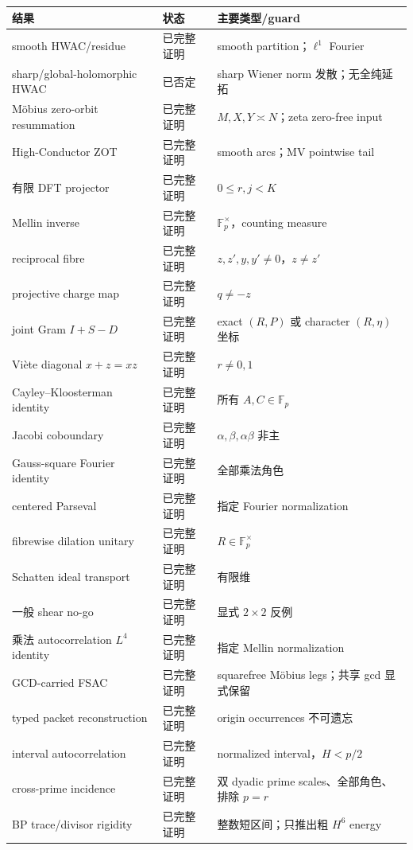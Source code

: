 \documentclass[11pt,a4paper]{ctexart}
\theoremstyle{definition}
\newcommand{\F}{\mathbb F}
\newcommand{\G}{\F_p^\times}
\newcommand{\1}{\mathbf 1}
\begin{document}
\begin{center}
\begin{tabular}{p{}p{}p{}}
\toprule
结果 & 状态 & 主要类型/guard\\
\midrule
smooth HWAC/residue & 已完整证明 & smooth partition；$\ell^1$ Fourier\\
sharp/global-holomorphic HWAC & 已否定 & sharp Wiener norm 发散；无全纯延拓\\
Möbius zero-orbit resummation & 已完整证明 & $M,X,Y\asymp N$；zeta zero-free input\\
High-Conductor ZOT & 已完整证明 & smooth arcs；MV pointwise tail\\
有限 DFT projector & 已完整证明 & $0\le r,j<K$\\
Mellin inverse & 已完整证明 & $\G$，counting measure\\
reciprocal fibre & 已完整证明 & $z,z',y,y'\ne0$，$z\ne z'$\\
projective charge map & 已完整证明 & $q\ne-z$\\
joint Gram $I+S-D$ & 已完整证明 & exact $(R,P)$ 或 character $(R,\eta)$ 坐标\\
Vi\`ete diagonal $x+z=xz$ & 已完整证明 & $r\ne0,1$\\
Cayley--Kloosterman identity & 已完整证明 & 所有 $A,C\in\F_p$\\
Jacobi coboundary & 已完整证明 & $\alpha,\beta,\alpha\beta$ 非主\\
Gauss-square Fourier identity & 已完整证明 & 全部乘法角色\\
centered Parseval & 已完整证明 & 指定 Fourier normalization\\
fibrewise dilation unitary & 已完整证明 & $R\in\G$\\
Schatten ideal transport & 已完整证明 & 有限维\\
一般 shear no-go & 已完整证明 & 显式 $2\times2$ 反例\\
乘法 autocorrelation $L^4$ identity & 已完整证明 & 指定 Mellin normalization\\
GCD-carried FSAC & 已完整证明 & squarefree Möbius legs；共享 gcd 显式保留\\
typed packet reconstruction & 已完整证明 & origin occurrences 不可遗忘\\
interval autocorrelation & 已完整证明 & normalized interval，$H<p/2$\\
cross-prime incidence & 已完整证明 & 双 dyadic prime scales、全部角色、排除 $p=r$\\
BP trace/divisor rigidity & 已完整证明 & 整数短区间；只推出粗 $H^6$ energy\\
\bottomrule
\end{tabular}
\end{center}
\end{document}
